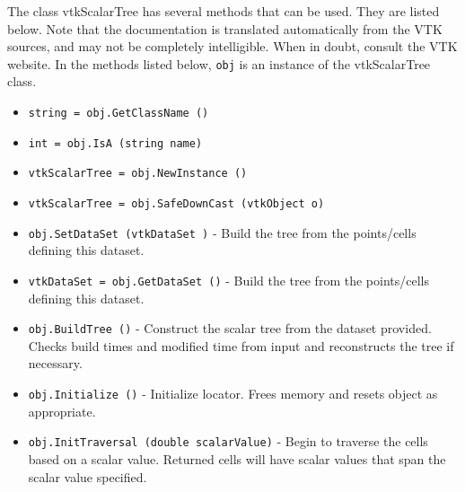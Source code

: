 The class vtkScalarTree has several methods that can be used.
  They are listed below.
Note that the documentation is translated automatically from the VTK sources,
and may not be completely intelligible.  When in doubt, consult the VTK website.
In the methods listed below, \verb|obj| is an instance of the vtkScalarTree class.
\begin{itemize}
\item  \verb|string = obj.GetClassName ()|

\item  \verb|int = obj.IsA (string name)|

\item  \verb|vtkScalarTree = obj.NewInstance ()|

\item  \verb|vtkScalarTree = obj.SafeDownCast (vtkObject o)|

\item  \verb|obj.SetDataSet (vtkDataSet )| -  Build the tree from the points/cells defining this dataset.

\item  \verb|vtkDataSet = obj.GetDataSet ()| -  Build the tree from the points/cells defining this dataset.

\item  \verb|obj.BuildTree ()| -  Construct the scalar tree from the dataset provided. Checks build times
 and modified time from input and reconstructs the tree if necessary.

\item  \verb|obj.Initialize ()| -  Initialize locator. Frees memory and resets object as appropriate.

\item  \verb|obj.InitTraversal (double scalarValue)| -  Begin to traverse the cells based on a scalar value. Returned cells
 will have scalar values that span the scalar value specified.

\end{itemize}
